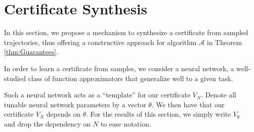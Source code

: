 \section{Certificate Synthesis}
\label{sec:training}

In this section, we propose a mechanism to synthesize a certificate from sampled trajectories, thus offering a constructive approach for algorithm $\mathcal{A}$ in Theorem \ref{thm:Guarantees}.

In order to learn a certificate from samples, we consider a neural network, a well-studied class of function approximators that generalize well to a given task.



Such a neural network acts as a ``template'' for our certificate $V_N$. 
Denote all tunable neural network parameters by a vector $\theta$. 
We then have that our certificate $V_N$ depends on $\theta$. 
For the results of this section, we simply write $V_\theta$ and drop the dependency on $N$ to ease notation. 

\setcounter{figure}{0}

